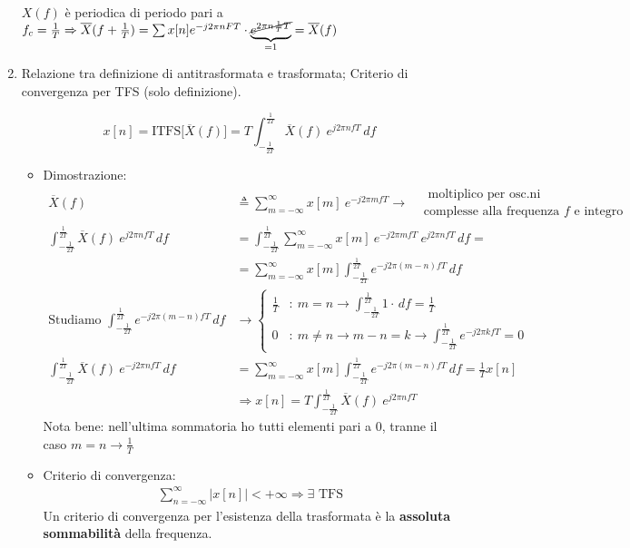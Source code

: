 \documentclass[
]{article}
\providecommand{\tightlist}{%
  \setlength{\itemsep}{0pt}\setlength{\parskip}{0pt}}
\begin{document}
\begin{enumerate}
  \(X(f)\) è periodica di periodo pari a
  \(f_c =\frac{1}{T} \Rightarrow \overline{X}(f+\frac{1}{T})= \sum x[n]e^{-j2\pi nFT} \cdot \underbrace{\cancel{e^{2\pi n \frac{1}{T}T}}}_{=1}=\overline{X}(f)\)
\item
  Relazione tra definizione di antitrasformata e trasformata; Criterio
  di convergenza per TFS (solo definizione).

  \[
   x[n] = \text{ITFS}\Big [ \overline{X}(f) \Big] = T \int_{-\frac{1}{2T}}^{\frac{1}{2T}} \overline{X}(f) \ e^{j2\pi n fT} \,df
   \]

  \begin{itemize}
  \tightlist
  \item
    Dimostrazione: \begin{align*}
     \overline{X}(f) &\triangleq \sum_{m=-\infty}^{\infty} x[m] \ e^{-j2\pi m fT} \to \begin{array}{cl}&\text{ moltiplico per osc.ni} \\ &\text{complesse alla frequenza } f \text{ e integro}\end{array}\\
     \int_{-\frac{1}{2T}}^{\frac{1}{2T}} \overline{X}(f) \ e^{j2\pi n fT} \,df &= \int_{-\frac{1}{2T}}^{\frac{1}{2T}} \sum_{m=-\infty}^{\infty} x[m] \ e^{-j2\pi m fT} \ e^{j2\pi n fT} \,df = \\
     & =\sum_{m=-\infty}^{\infty} x[m] \int_{-\frac{1}{2T}}^{\frac{1}{2T}} e^{-j2\pi (m-n)fT}\,df \\
     \text{Studiamo } \int_{-\frac{1}{2T}}^{\frac{1}{2T}} e^{-j2\pi (m-n)fT}\,df &\longrightarrow
     \left\{ \begin{array}{cl}
     \frac{1}{T} & : \ m=n \to \int_{-\frac{1}{2T}}^{\frac{1}{2T}} 1\cdot \,df = \frac{1}{T} \\
     0 & : \ m \neq n \to m-n=k \to \int_{-\frac{1}{2T}}^{\frac{1}{2T}} e^{-j2\pi kfT} = 0
     \end{array} \right. \\    
     \int_{-\frac{1}{2T}}^{\frac{1}{2T}} \overline{X}(f) \ e^{-j2\pi nfT} \,df &= \sum_{m=-\infty}^{\infty}
     x[m] \int_{-\frac{1}{2T}}^{\frac{1}{2T}} e^{-j2\pi(m-n)fT}\,df = \frac{1}{T}x[n] \\
     & \Rightarrow x[n] = T \int_{-\frac{1}{2T}}^{\frac{1}{2T}}\overline{X}(f)\ e^{j2\pi nfT}
     \end{align*} Nota bene: nell'ultima sommatoria ho tutti elementi
    pari a \(0\), tranne il caso \(m=n \to \frac{1}{T}\)
  \item
    Criterio di convergenza: \begin{gather*}
     \sum_{n=-\infty}^{\infty} \Big|x[n]\Big| < +\infty \Rightarrow \exists \text{ TFS}
     \end{gather*} Un criterio di convergenza per l'esistenza della
    trasformata è la \textbf{assoluta sommabilità} della frequenza.
  \end{itemize}
\end{enumerate}
\end{document}
